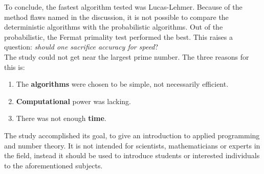 \documentclass[main.tex]{subfiles}
\begin{document}
To conclude, the fastest algorithm tested was Lucas-Lehmer. Because of the
method flaws named in the discussion, it is not possible to compare the
deterministic algorithms with the probabilistic algorithms. Out of the
probabilistic, the Fermat primality test performed the best. This raises a
question: \emph{should one sacrifice accuracy for speed}? \\

The study could not get near the largest prime number. The three reasons for
this is:

\begin{enumerate}
\item The \textbf{algorithms} were chosen to be simple, not necessarily efficient.
\item \textbf{Computational} power was lacking.
\item There was not enough \textbf{time}.
\end{enumerate}

The study accomplished its goal, to give an introduction to applied programming
and number theory. It is not intended for scientists, mathematicians or experts
in the field, instead it should be used to introduce students or interested
individuals to the aforementioned subjects.
\end{document}
